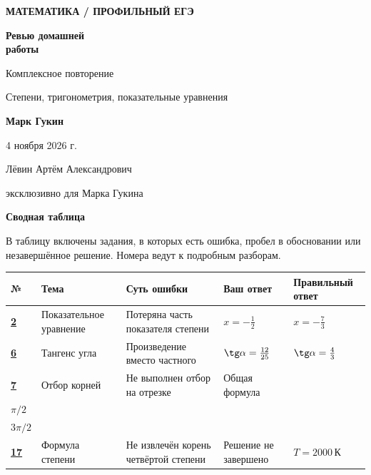 \documentclass[a4paper,11pt]{article}
\begin{document}
\thispagestyle{empty}
\vspace*{18mm}
\begin{center}
{\large\color{accent}\bfseries МАТЕМАТИКА / ПРОФИЛЬНЫЙ ЕГЭ}\par
\vspace{27mm}
{\fontsize{30}{36}\selectfont\bfseries Ревью домашней\\работы}\par
\vspace{9mm}
{\Large Комплексное повторение}\par
\vspace{4mm}
{\normalsize Степени, тригонометрия, показательные уравнения}\par
\vspace{21mm}
{\Large\bfseries Марк Гукин}\par
\vspace{11mm}
4 ноября 2026 г.\par
\end{center}
\vfill
\begin{center}
{\small Лёвин Артём Александрович}\par
{\small эксклюзивно для Марка Гукина}\par
\vspace{10mm}
\end{center}
\clearpage
{\LARGE\bfseries Сводная таблица}\par
\vspace{3mm}
В таблицу включены задания, в которых есть ошибка, пробел в обосновании или незавершённое решение. Номера ведут к подробным разборам.\par
\vspace{4mm}
{\small
\renewcommand{\arraystretch}{1.38}
\begin{tabularx}{\linewidth}{@{}p{9mm}p{27mm}X p{23mm}p{31mm}@{}}
\toprule
№ & Тема & Суть ошибки & Ваш ответ & Правильный ответ\\
\midrule
\hyperref[task:2]{\textbf{2}} & Показательное уравнение & Потеряна часть показателя степени & $x=-\frac12$ & $x=-\frac73$\\
\hyperref[task:6]{\textbf{6}} & Тангенс угла & Произведение вместо частного & $\tg\alpha=\frac{12}{25}$ & $\tg\alpha=\frac43$\\
\hyperref[task:7]{\textbf{7}} & Отбор корней & Не выполнен отбор на отрезке & Общая формула & \begin{tabular}[t]{@{}l@{}}$-\pi/2$\\[3pt]$\pi/2$\\[3pt]$3\pi/2$\end{tabular}\\
\hyperref[task:17]{\textbf{17}} & Формула степени & Не извлечён корень четвёртой степени & Решение не завершено & $T=2000\,\text{К}$\\
\bottomrule
\end{tabularx}\par
}
\end{document}

